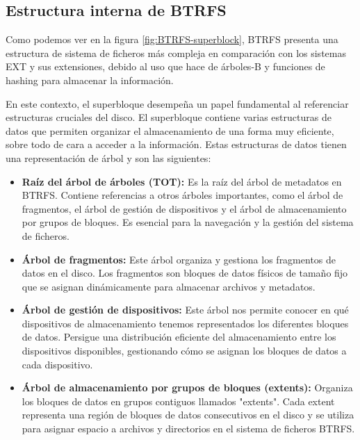 \subsection{Estructura interna de BTRFS}

Como podemos ver en la figura \ref{fig:BTRFS-superblock}, BTRFS presenta una estructura de sistema de ficheros más compleja en comparación con los sistemas EXT y sus extensiones, debido al uso que hace de árboles-B y funciones de hashing para almacenar la información.

En este contexto, el superbloque desempeña un papel fundamental al referenciar estructuras cruciales del disco. El superbloque contiene varias estructuras de datos que permiten organizar el almacenamiento de una forma muy eficiente, sobre todo de cara a acceder a la información. Estas estructuras de datos tienen una representación de árbol y son las siguientes:

\begin{itemize}
    \item \textbf{Raíz del árbol de árboles (TOT):} Es la raíz del árbol de metadatos en BTRFS. Contiene referencias a otros árboles importantes, como el árbol de fragmentos, el árbol de gestión de dispositivos y el árbol de almacenamiento por grupos de bloques. Es esencial para la navegación y la gestión del sistema de ficheros.
    
    \item \textbf{Árbol de fragmentos:} Este árbol organiza y gestiona los fragmentos de datos en el disco. Los fragmentos son bloques de datos físicos de tamaño fijo que se asignan dinámicamente para almacenar archivos y metadatos.
    
    \item \textbf{Árbol de gestión de dispositivos:} Este árbol nos permite conocer en qué dispositivos de almacenamiento tenemos representados los diferentes bloques de datos. Persigue una distribución eficiente del almacenamiento entre los dispositivos disponibles, gestionando cómo se asignan los bloques de datos a cada dispositivo.
    
    \item \textbf{Árbol de almacenamiento por grupos de bloques (extents):} Organiza los bloques de datos en grupos contiguos llamados "extents". Cada extent representa una región de bloques de datos consecutivos en el disco y se utiliza para asignar espacio a archivos y directorios en el sistema de ficheros BTRFS.
\end{itemize}

